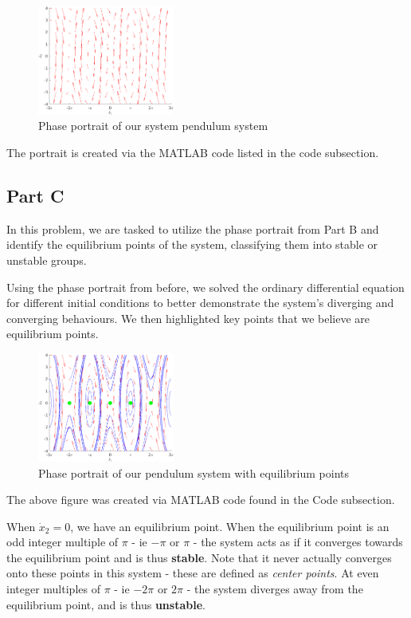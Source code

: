 \documentclass{article}
\begin{document}
\begin{figure}[H]
    \centering
    \includegraphics[width = 0.4\textwidth]{figures/phase_portrait.png}
    \caption{Phase portrait of our system pendulum system}
    \label{fig:phase-portrait}
\end{figure}

The portrait is created via the MATLAB code listed in the code subsection.

\subsection*{Part C}

In this problem, we are tasked to utilize the phase portrait from Part B and identify the equilibrium points of the system, classifying them into stable or unstable groups.

Using the phase portrait from before, we solved the ordinary differential equation for different initial conditions to better demonstrate the system's diverging and converging behaviours. We then highlighted key points that we believe are equilibrium points.

\begin{figure}[H]
    \centering
    \includegraphics[width = 0.4\textwidth]{figures/phase_portrait_with_equilibrium_points.png}
    \caption{Phase portrait of our pendulum system with equilibrium points}
    \label{fig:phase-portrait-equilibrium}
\end{figure}

The above figure was created via MATLAB code found in the Code subsection.

When $\dot{x}_2 = 0$, we have an equilibrium point. When the equilibrium point is an odd integer multiple of $\pi$ - ie $-\pi$ or $\pi$ - the system acts as if it converges towards the equilibrium point and is thus \textbf{stable}. Note that it never actually converges onto these points in this system - these are defined as \textit{center points}. At even integer multiples of $\pi$ - ie $-2\pi$ or $2\pi$ - the system diverges away from the equilibrium point, and is thus \textbf{unstable}.
\end{document}
